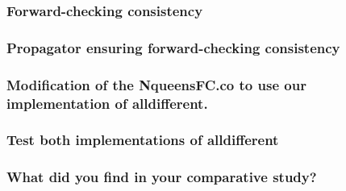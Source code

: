 \documentclass{eplDoc}
\begin{document}
\subsubsection{Forward-checking consistency}

\subsubsection{Propagator ensuring forward-checking consistency}

\subsubsection{Modification of the NqueensFC.co to use our implementation of alldifferent.}

\subsubsection{Test both implementations of alldifferent}

\subsubsection{What did you find in your comparative study?}
\end{document}
